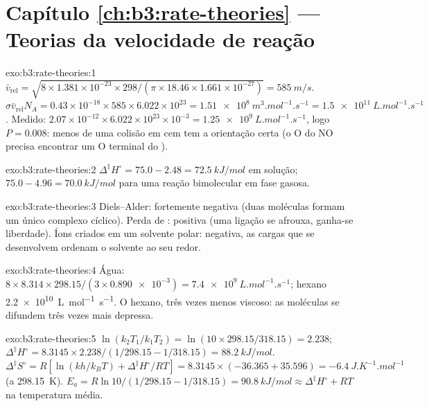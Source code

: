 \section*{Capítulo \ref{ch:b3:rate-theories} --- Teorias da velocidade de reação}

\begin{solution}{exo:b3:rate-theories:1}
$\bar v_{\mathrm{rel}} = \sqrt{8 \times 1.381\times10^{-23} \times 298/(\pi \times 18.46 \times 1.661\times10^{-27})} = \qty{585}{m/s}$.
$\sigma\bar v_{\mathrm{rel}}N_A = 0.43\times10^{-18} \times 585 \times 6.022\times10^{23} = \qty{1.51e8}{m^3.mol^{-1}.s^{-1}} =
\qty{1.5e11}{L.mol^{-1}.s^{-1}}$. Medido: $2.07\times10^{-12} \times 6.022\times10^{23}\times10^{-3} =
\qty{1.25e9}{L.mol^{-1}.s^{-1}}$, logo $P = 0.008$: menos de uma colisão em cem tem a
orientação certa (o O do NO precisa encontrar um O terminal do ).
\end{solution}

\begin{solution}{exo:b3:rate-theories:2}
$\Delta^{\ddagger}H^\circ = 75.0 - 2.48 = \qty{72.5}{kJ/mol}$ em solução; $75.0 - 4.96 = \qty{70.0}{kJ/mol}$
para uma reação bimolecular em fase gasosa.
\end{solution}

\begin{solution}{exo:b3:rate-theories:3}
Diels--Alder: fortemente negativa (duas moléculas formam um único complexo cíclico).
Perda de : positiva (uma ligação se afrouxa, ganha-se liberdade). Íons criados em
um solvente polar: negativa, as cargas que se desenvolvem ordenam o solvente ao seu redor.
\end{solution}

\begin{solution}{exo:b3:rate-theories:4}
Água: $8 \times 8.314 \times 298.15/(3 \times \num{0.890e-3}) = \qty{7.4e9}{L.mol^{-1}.s^{-1}}$; hexano
\qty{2.2e10}{L.mol^{-1}.s^{-1}}. O hexano, três vezes menos viscoso: as moléculas se difundem três
vezes mais depressa.
\end{solution}

\begin{solution}{exo:b3:rate-theories:5}
$\ln(k_2T_1/k_1T_2) = \ln(10 \times 298.15/318.15) = 2.238$; $\Delta^{\ddagger}H^\circ = 8.3145 \times 2.238/(1/298.15 -
1/318.15) = \qty{88.2}{kJ/mol}$. $\Delta^{\ddagger}S^\circ = R[\ln(kh/k_BT) + \Delta^{\ddagger}H^\circ/RT] = 8.3145 \times
(-36.365 + 35.596) = \qty{-6.4}{J.K^{-1}.mol^{-1}}$ (a \qty{298.15}{K}). $E_a = R\ln10/(1/298.15 - 1/318.15) =
\qty{90.8}{kJ/mol} \approx \Delta^{\ddagger}H^\circ + RT$ na temperatura média.
\end{solution}

